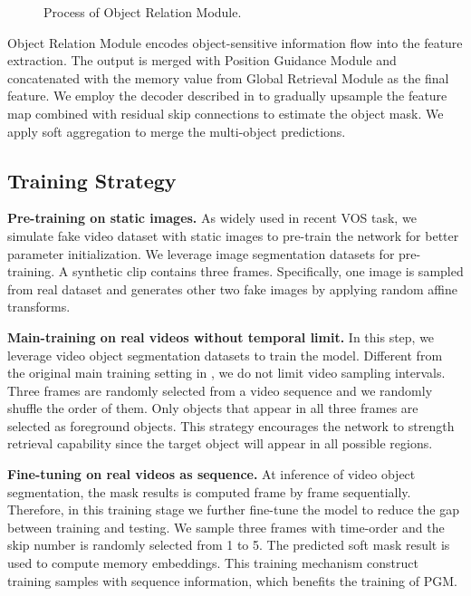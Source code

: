 \documentclass[final]{cvpr}
\begin{document}
\begin{figure}[!t]
\begin{center}
	\setlength{\fboxrule}{0pt}
\end{center}
\caption{Process of Object Relation Module.}
\label{fig:prior}
\end{figure}

Object Relation Module encodes object-sensitive information flow into the feature extraction. The output is merged with Position Guidance Module and concatenated with the memory value from Global Retrieval Module as the final feature. We employ the decoder described in \cite{rgmp,STM} to gradually upsample the feature map combined with residual skip connections to estimate the object mask. We apply soft aggregation\cite{rgmp,STM} to merge the
multi-object predictions. 



\subsection{Training Strategy}\label{sec:train}
\textbf{Pre-training on static images. }
As widely used in recent VOS task\cite{rgmp,STM,KMN}, we simulate fake video dataset with static images to pre-train the network for better parameter initialization. We leverage image segmentation datasets\cite{pre1,pre2,coco} for pre-training. A synthetic clip contains three frames. Specifically, one image is sampled from real dataset and generates other two fake images by applying random affine transforms. 


\textbf{Main-training on real videos without temporal limit. }
In this step, we leverage video object segmentation datasets to train the model. Different from the original main training setting in \cite{STM}, we do not limit video sampling intervals. Three frames are randomly selected from a video sequence and we randomly shuffle the order of them. 
Only objects that appear in all three frames are selected as foreground objects. 
This strategy encourages the network to strength retrieval capability since the target object will appear in all possible regions. 

\textbf{Fine-tuning on real videos as sequence. }
At inference of video object segmentation, the mask results is computed frame by frame sequentially. Therefore, in this training stage we further fine-tune the model to reduce the gap between training and testing. We sample three frames with time-order and the skip number is randomly selected from 1 to 5. The predicted soft mask result is used to compute memory embeddings. This training mechanism construct training samples with sequence information, which benefits the training of PGM.
\end{document}
